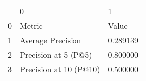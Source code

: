 \begin{tabular}{lll}
 & 0 & 1 \\
0 & Metric & Value \\
1 & Average Precision & 0.289139 \\
2 & Precision at 5 (P@5) & 0.800000 \\
3 & Precision at 10 (P@10) & 0.500000 \\
\end{tabular}
